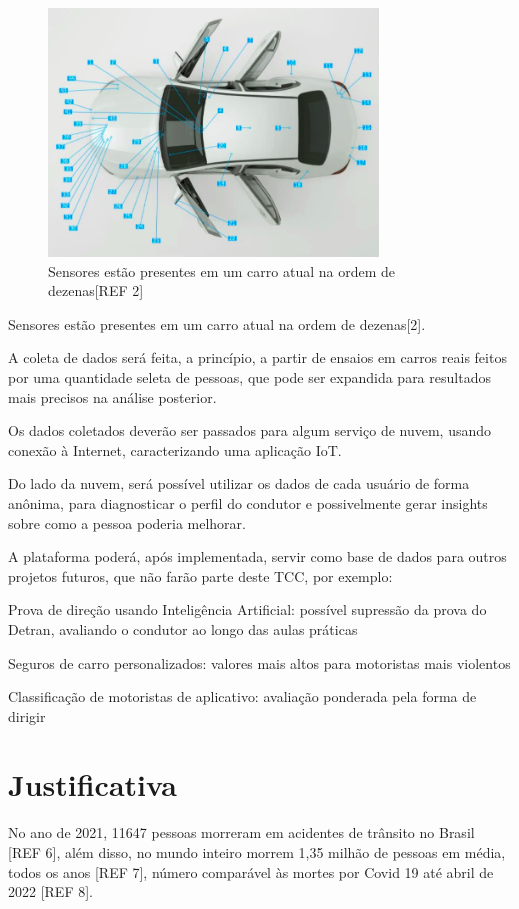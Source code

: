 \begin{figure}[hp]
    \centering
    
    \includegraphics[]{figures/sensores_carro.png}
    
    \caption{Sensores estão presentes em um carro atual na ordem de dezenas[REF 2]}
\end{figure}

Sensores estão presentes em um carro atual na ordem de dezenas[2].

A coleta de dados será feita, a princípio, a partir de ensaios em carros reais feitos por uma quantidade seleta de pessoas, que pode ser expandida para resultados mais precisos na análise posterior.

Os dados coletados deverão ser passados para algum serviço de nuvem, usando conexão à Internet, caracterizando uma aplicação IoT.
	
Do lado da nuvem, será possível utilizar os dados de cada usuário de forma anônima, para diagnosticar o perfil do condutor e possivelmente gerar insights sobre como a pessoa poderia melhorar.
	
A plataforma poderá, após implementada, servir como base de dados para outros projetos futuros, que não farão parte deste TCC, por exemplo:

Prova de direção usando Inteligência Artificial: possível supressão da prova do Detran, avaliando o condutor ao longo das aulas práticas

Seguros de carro personalizados: valores mais altos para motoristas mais violentos

Classificação de motoristas de aplicativo: avaliação ponderada pela forma de dirigir

 
\section{Justificativa}
No ano de 2021, 11647 pessoas morreram em acidentes de trânsito no Brasil [REF 6], além disso, no mundo inteiro morrem 1,35 milhão de pessoas em média, todos os anos [REF 7], número comparável às mortes por Covid 19 até abril de 2022 [REF 8].

